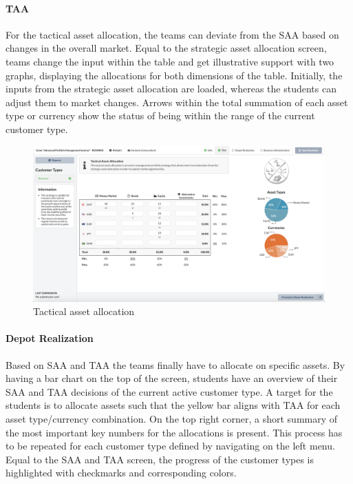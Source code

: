 \paragraph{TAA}
For the tactical asset allocation, the teams can deviate from the SAA based on changes in the overall market. Equal to the strategic asset allocation screen, teams change the input within the table and get illustrative support with two graphs, displaying the allocations for both dimensions of the table. Initially, the inputs from the strategic asset allocation are loaded, whereas the students can adjust them to market changes. Arrows within the total summation of each asset type or currency show the status of being within the range of the current customer type.
\begin{figure}[h!]
  \centering
  \includegraphics[scale=0.2]{img/application-overview/teams/04_taa.png}
  \caption{Tactical asset allocation}
\end{figure}

\paragraph{Depot Realization}
Based on SAA and TAA the teams finally have to allocate on specific assets. By having a bar chart on the top of the screen, students have an overview of their SAA and TAA decisions of the current active customer type. A target for the students is to allocate assets such that the yellow bar aligns with TAA for each asset type/currency combination. On the top right corner, a short summary of the most important key numbers for the allocations is present.
This process has to be repeated for each customer type defined by navigating on the left menu. Equal to the SAA and TAA screen, the progress of the customer types is highlighted with checkmarks and corresponding colors.

